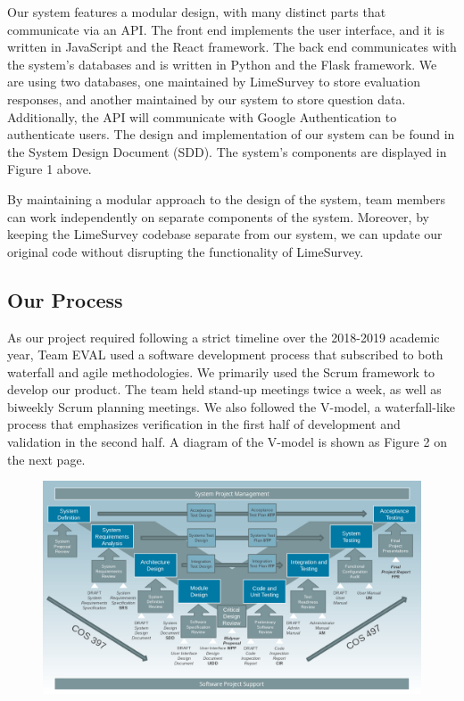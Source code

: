 \documentclass{article}
\begin{document}
Our system features a modular design, with many distinct parts that communicate via an API. The front end implements the user interface, and it is written in JavaScript and the React framework. The back end communicates with the system's databases and is written in Python and the Flask framework. We are using two databases, one maintained by LimeSurvey to store evaluation responses, and another maintained by our system to store question data. Additionally, the API will communicate with Google Authentication to authenticate users. The design and implementation of our system can be found in the System Design Document (SDD). The system's components are displayed in Figure 1 above.

By maintaining a modular approach to the design of the system, team members can work independently on separate components of the system. Moreover, by keeping the LimeSurvey codebase separate from our system, we can update our original code without disrupting the functionality of LimeSurvey.

\subsection{Our Process}

As our project required following a strict timeline over the 2018-2019 academic year, Team EVAL used a software development process that subscribed to both waterfall and agile methodologies. We primarily used the Scrum framework to develop our product. The team held stand-up meetings twice a week, as well as biweekly Scrum planning meetings. We also followed the V-model, a waterfall-like process that emphasizes verification in the first half of development and validation in the second half. A diagram of the V-model is shown as Figure 2 on the next page.

\begin{center}
\begin{figure}[H]
\centering
\vspace{2mm}
{\includegraphics[scale=.6]{images/V-model-Yoo.png}}
\end{figure}
\end{center}
\end{document}
